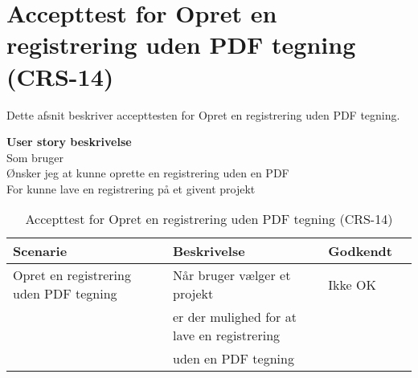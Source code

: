 \section{Accepttest for Opret en registrering uden PDF tegning (CRS-14)}
Dette afsnit beskriver accepttesten for Opret en registrering uden PDF tegning.

\textbf{User story beskrivelse} \\
Som bruger \\
Ønsker jeg at kunne oprette en registrering uden en PDF  \\
For kunne lave en registrering på et givent projekt

\begin{table}[H]
	\centering
	\begin{tabular}{|ll|l|ll|} \hline
		\textbf{Scenarie} &  & \textbf{Beskrivelse}&  \textbf{Godkendt}&  \\ \hline
		Opret en registrering uden PDF tegning&  &  Når bruger vælger et projekt &  Ikke OK&  \\
		& & er der mulighed for at lave en registrering& & \\ 
			& & uden en PDF tegning& & \\ \hline
	\end{tabular}
	\caption{Accepttest for Opret en registrering uden PDF tegning (CRS-14)}
	\label{AcceptUdenPDF}
\end{table}

\clearpage